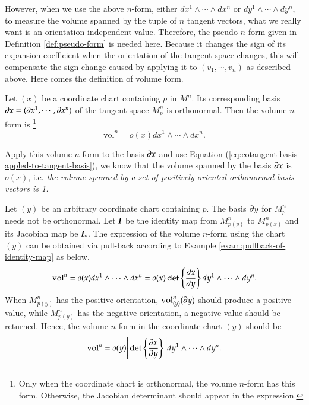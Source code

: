 \documentclass[11pt, a4paper]{book}
\begin{document}
However, when we use the above $n$-form, either $dx^1 \wedge \cdots \wedge dx^n$ or
$dy^1 \wedge \cdots \wedge dy^n$, to measure the volume spanned by the tuple of $n$
tangent vectors, what we really want is an orientation-independent value. Therefore, the
pseudo $n$-form given in Definition \ref{def:pseudo-form} is needed here. Because it
changes the sign of its expansion coefficient when the orientation of the tangent space
changes, this will compensate the sign change caused by applying it to $(v_1,\cdots,v_n)$
as described above. Here comes the definition of volume form.

\begin{Definition}
  \label{def:volume-form}
  Let $(x)$ be a coordinate chart containing $p$ in $M^n$. Its corresponding basis
  $\boldsymbol{\partial}x = (\boldsymbol{\partial}x^1,\cdots,\boldsymbol{\partial}x^n)$ of the tangent space
  $M_p^n$ is orthonormal. Then the volume $n$-form is \footnote{Only when the coordinate
    chart is orthonormal, the volume $n$-form has this form. Otherwise, the Jacobian
    determinant should appear in the expression.}
  \begin{equation}
    \label{eq:volume-form}
    \mathrm{vol}^n = o(x) dx^1 \wedge \cdots \wedge dx^n.
  \end{equation}
\end{Definition} 
Apply this volume $n$-form to the basis $\boldsymbol{\partial}x$ and use Equation
(\ref{eq:cotangent-basis-appled-to-tangent-basis}), we know that the volume spanned by the
basis $\boldsymbol{\partial}x$ is $o(x)$, i.e. \emph{the volume spanned by a set of positively
  oriented orthonormal basis vectors is 1.}

Let $(y)$ be an arbitrary coordinate chart containing $p$. The basis $\boldsymbol{\partial}y$ for
$M_{p}^n$ needs not be orthonormal. Let $\boldsymbol{I}$ be the identity map from $M_{p(y)}^n$
to $M_{p(x)}^n$ and its Jacobian map be $\boldsymbol{I}_{*}$. The expression of the volume
$n$-form using the chart $(y)$ can be obtained via pull-back according to Example
\ref{exam:pullback-of-identity-map} as below.
\begin{equation*}
  \mathrm{vol}^n = o(x) dx^1 \wedge \cdots \wedge dx^n = o(x) \det \left\{  \frac{\partial x}{\partial
      y} \right\} dy^1 \wedge \cdots \wedge dy^n.
\end{equation*}
When $M_{p(y)}^n$ has the positive orientation, $\mathrm{vol}_{(y)}^n(\boldsymbol{\partial}y)$
should produce a positive value, while $M_{p(y)}^n$ has the negative orientation, a
negative value should be returned. Hence, the volume $n$-form in the coordinate chart
$(y)$ should be
\begin{equation}
  \label{eq:volume-form-in-y}
  \mathrm{vol}^n = o(y) \Bigg\vert\det \left\{ \frac{\partial x}{\partial y}
  \right\}\Bigg\vert dy^1 \wedge\cdots\wedge dy^n.
\end{equation}
\end{document}
